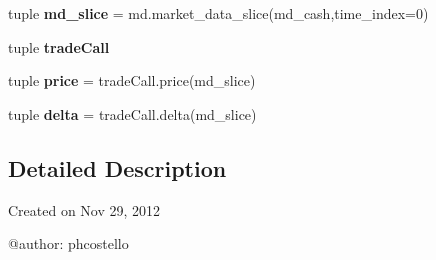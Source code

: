 \begin{DoxyCompactItemize}
\item 
\hypertarget{namespacestrategy__tester_1_1trade_ab1d069a6d0239be2e9f7e957f6680dcb}{tuple {\bfseries md\-\_\-slice} = md.\-market\-\_\-data\-\_\-slice(md\-\_\-cash,time\-\_\-index=0)}\label{namespacestrategy__tester_1_1trade_ab1d069a6d0239be2e9f7e957f6680dcb}

\item 
tuple {\bfseries trade\-Call}
\item 
\hypertarget{namespacestrategy__tester_1_1trade_a2edefbad0fd8f1362333ed39a63d84d2}{tuple {\bfseries price} = trade\-Call.\-price(md\-\_\-slice)}\label{namespacestrategy__tester_1_1trade_a2edefbad0fd8f1362333ed39a63d84d2}

\item 
\hypertarget{namespacestrategy__tester_1_1trade_ade8596bc9aea8fc158ce7d2a9f5675f8}{tuple {\bfseries delta} = trade\-Call.\-delta(md\-\_\-slice)}\label{namespacestrategy__tester_1_1trade_ade8596bc9aea8fc158ce7d2a9f5675f8}

\end{DoxyCompactItemize}


\subsection{\-Detailed \-Description}
\begin{DoxyVerb}
Created on Nov 29, 2012

@author: phcostello
\end{DoxyVerb}
 


